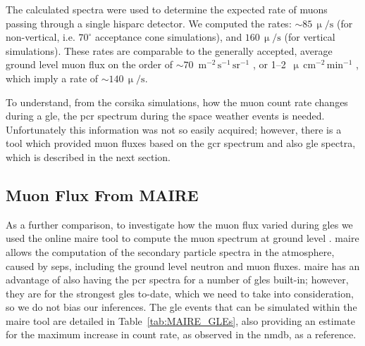 The calculated spectra were used to determine the expected rate of muons passing through a single \gls{hisparc} detector. We computed the rates: $\sim 85 \, \upmu/\mathrm{s}$ (for non-vertical, i.e. $70^\circ$ acceptance cone simulations), and $160 \, \upmu/\mathrm{s}$ (for vertical simulations). These rates are comparable to the generally accepted, average ground level muon flux on the order of $\sim 70$~$\mathrm{m}^{-2}\,\mathrm{s}^{-1}\,\mathrm{sr}^{-1}$ \citep{cecchini_cosmic_2000, blackmore_terrestrial_2015, pereira_ground_2020, particle_data_group_review_2020}, or 1--2~$\upmu\,\mathrm{cm}^{-2}\,\mathrm{min}^{-1}$ \citep{particle_data_group_review_2020}, which imply a rate of $\sim140 \, \upmu/\mathrm{s}$. 

To understand, from the \gls{corsika} simulations, how the muon count rate changes during a \gls{gle}, the \gls{pcr} spectrum during the space weather events is needed. Unfortunately this information was not so easily acquired; however, there is a tool which provided muon fluxes based on the \gls{gcr} spectrum and also \gls{gle} spectra, which is described in the next section.



\subsection{Muon Flux From MAIRE}\label{sec:MAIRE_flux}

As a further comparison, to investigate how the muon flux varied during \glspl{gle} we used the online \gls{maire} tool to compute the muon spectrum at ground level \citep{dyer_calculations_2003, lei_atmospheric_2004}. \gls{maire} allows the computation of the secondary particle spectra in the atmosphere, caused by \glspl{sep}, including the ground level neutron and muon fluxes. \gls{maire} has an advantage of also having the \gls{pcr} spectra for a number of \glspl{gle} built-in; however, they are for the strongest \glspl{gle} to-date, which we need to take into consideration, so we do not bias our inferences. The \gls{gle} events that can be simulated within the \gls{maire} tool are detailed in Table~\ref{tab:MAIRE_GLEs}, also providing an estimate for the maximum increase in count rate, as observed in the \gls{nmdb}, as a reference.

